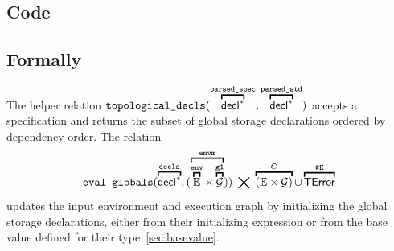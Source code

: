\documentclass{book}
\newcommand\eqname[0]{\stackrel{\mathsmaller{\mathsf{name}}}{=}}
\newcommand\overname[2]{\overbracket{#1}^{#2}}
\newcommand\XGraphs[0]{\mathcal{G}}
\newcommand\ordered[3]{{#1}\xrightarrow{#2}{#3}}
\newcommand\evalarrow[0]{\stackrel{\mathsf{asl}}{\rightsquigarrow}}
\newcommand\aslrel[0]{\bigtimes}
\newcommand\sslash[0]{\mathbin{/\mkern-6mu/}}
\newcommand\terminateas[0]{\;\sslash\;}
\newcommand\ErrorConfig[0]{\texttt{\#E}}
\newcommand\TError[0]{\textsf{TError}}
\newcommand\evalexprsef[1]{\texttt{eval\_expr\_sef}(#1)}
\newcommand\parsedspec[0]{\texttt{parsed\_spec}}
\newcommand\parsedstd[0]{\texttt{parsed\_std}}
\newcommand\topologicaldecls[0]{\texttt{topological\_decls}}
\newcommand\evalglobals[0]{\texttt{eval\_globals}}
\newcommand\env[0]{\texttt{env}}
\newcommand\envone[0]{\texttt{env1}}
\newcommand\envtwo[0]{\texttt{env2}}
\newcommand\ve[0]{\texttt{e}}
\newcommand\vv[0]{\texttt{v}}
\newcommand\vt[0]{\texttt{t}}
\newcommand\vgone[0]{\texttt{g1}}
\newcommand\vgtwo[0]{\texttt{g2}}
\newcommand\name[0]{\texttt{name}}
\newcommand\envm[0]{\texttt{envm}}
\newcommand\vd[0]{\texttt{d}}
\newcommand\vdecls[0]{\texttt{decls}}
\begin{document}
  \subsection{Code}

\begin{emptyformal}
  \subsection{Formally}
  The helper relation $\topologicaldecls(\overname{\decl^*}{\parsedspec}, \overname{\decl^*}{\parsedstd})$
  accepts a specification and returns the subset of global storage declarations ordered by
  dependency order.
  The relation
  \[
    \evalglobals(\overname{\decl^*}{\vdecls}, (\overname{\overname{\envs}{\env} \times \overname{\XGraphs}{\vgone}}{\envm}))
    \;\aslrel\; \overname{(\envs \times \XGraphs)}{C} \cup \overname{\TError}{\ErrorConfig}
  \]
  updates the input environment and execution graph by initializing the global storage declarations,
  either from their initializing expression or from the base value defined for their type~\ref{sec:basevalue}.



\end{emptyformal}
\end{document}
